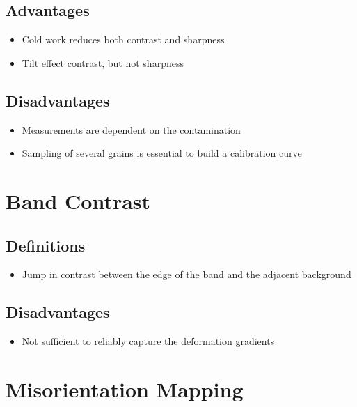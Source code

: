 \documentclass[letterpaper]{article}
\begin{document}
		\subsection{Advantages}
			\begin{itemize}
				\item Cold work reduces both contrast and sharpness \cite{Wilkinson1991}
				\item Tilt effect contrast, but not sharpness \cite{Wilkinson1991}
			\end{itemize}
		
		\subsection{Disadvantages}
			\begin{itemize}
				\item Measurements are dependent on the contamination \cite{Wilkinson1991}
				\item Sampling of several grains is essential to build a calibration curve \cite{Wilkinson1991}
			\end{itemize}

\newpage
	\section{Band Contrast}
		\subsection{Definitions}
			\begin{itemize}
				\item Jump in contrast between the edge of the band and the adjacent background \cite{Brewer2006}
			\end{itemize}
		
		\subsection{Disadvantages}
			\begin{itemize}
				\item Not sufficient to reliably capture the deformation gradients \cite{Brewer2006}
			\end{itemize}

\newpage
	\section{Misorientation Mapping}
\end{document}
